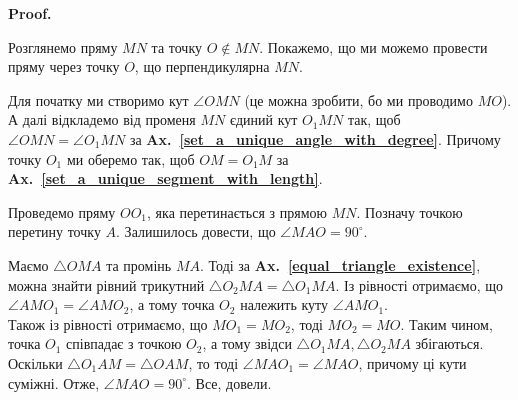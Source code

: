 \documentclass[a4paper, 10pt]{article}
\makeatletter
\theoremstyle{theoremdd}
\theoremstyle{theoremdd}
\theoremstyle{theoremdd}
\theoremstyle{theoremdd}
\theoremstyle{theoremdd}
\theoremstyle{theoremdd}
\theoremstyle{theoremdd}
\theoremstyle{theoremdd}
\theoremstyle{theoremdd}
\newcommand\axref[1]{\textbf{Ax.~\ref{#1}}}
\renewenvironment{proof}[1][Proof.\\]{\par
\pushQED{\hfill \qed}%
\normalfont \topsep6\p@\@plus6\p@\relax
\trivlist
\item\relax
{\bfseries
#1\@addpunct{.}}\hspace\labelsep\ignorespaces
}{%
\popQED\endtrivlist\@endpefalse
}
\makeatother
\begin{document}
\begin{proof}
Розглянемо пряму $MN$ та точку $O \not\in MN$. Покажемо, що ми можемо провести пряму через точку $O$, що перпендикулярна $MN$.
\begin{figure}[H]
\centering
{}
\end{figure}
Для початку ми створимо кут $\angle OMN$ (це можна зробити, бо ми проводимо $MO$). А далі відкладемо від променя $MN$ єдиний кут $O_1MN$ так, щоб $\angle OMN = \angle O_1MN$ за \axref{set_a_unique_angle_with_degree}. Причому точку $O_1$ ми оберемо так, щоб $OM=O_1M$ за \axref{set_a_unique_segment_with_length}.
\begin{figure}[H]
\centering
{}
\end{figure}
Проведемо пряму $OO_1$, яка перетинається з прямою $MN$. Позначу точкою перетину точку $A$. Залишилось довести, що $\angle MAO = 90^\circ$.
\begin{figure}[H]
\centering
{}
\end{figure}
Маємо $\triangle OMA$ та промінь $MA$. Тоді за \axref{equal_triangle_existence}, можна знайти рівний трикутний $\triangle O_2MA = \triangle O_1MA$. Із рівності отримаємо, що $\angle AMO_1 = \angle AMO_2$, а тому точка $O_2$ належить куту $\angle AMO_1$.\\ 
Також із рівності отримаємо, що $MO_1 = MO_2$, тоді $MO_2 = MO$. Таким чином, точка $O_1$ співпадає з точкою $O_2$, а тому звідси $\triangle O_1MA, \triangle O_2MA$ збігаються. Оскільки $\triangle O_1AM = \triangle OAM$, то тоді $\angle MAO_1 = \angle MAO$, причому ці кути суміжні. Отже, $\angle MAO = 90^\circ$. Все, довели.

\end{proof}
\end{document}
